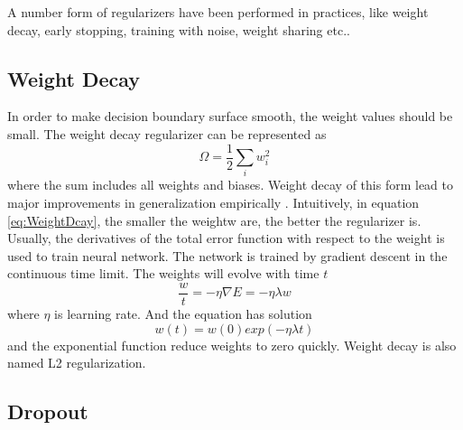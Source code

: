 A number form of regularizers have been performed in practices, like weight decay, early stopping, training with noise, weight sharing etc..

\subsection{Weight Decay}

In order to make decision boundary surface smooth, the weight values should be small. The weight decay regularizer can be represented as
\begin{equation}\label{eq:WeightDcay}
\Omega = \frac{1}{2} \sum_i w_{i}^2
\end{equation}
where the sum includes all weights and biases. Weight decay of this form lead to major improvements in generalization empirically \citep{hinton1987learning}. Intuitively, in equation \ref{eq:WeightDcay}, the smaller the weightw are, the better the regularizer is. Usually, the derivatives of the total error function with respect to the weight is used to train neural network. The network is trained by gradient descent in the continuous time limit. The weights will evolve with time $t$
\begin{equation}\label{eq:WeightDecayTime}
\frac{w}{t} = -\eta\nabla E = -\eta\lambda w
\end{equation}
where $\eta$ is learning rate. And the equation has solution
\begin{equation}\label{eq:WeightDecaySolution}
w(t) = w(0)exp(-\eta\lambda t)
\end{equation}
and the exponential function reduce weights to zero quickly. Weight decay is also named L2 regularization.

\subsection{Dropout}

